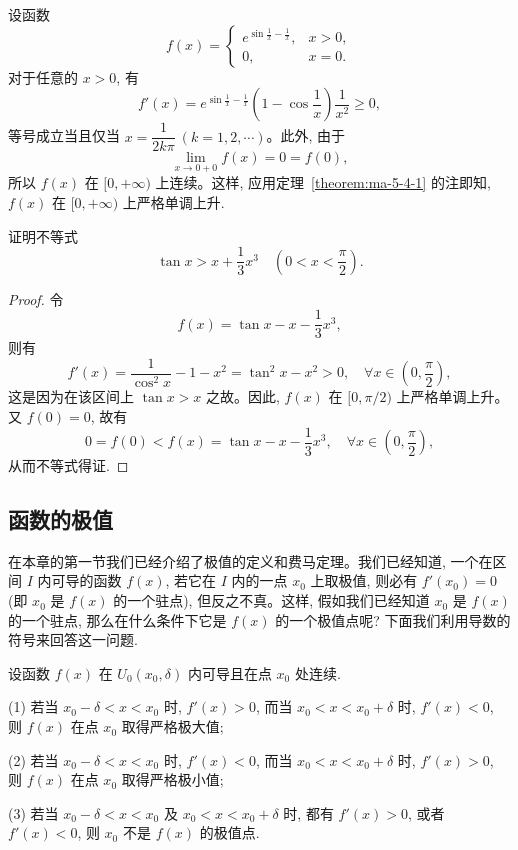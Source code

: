 \begin{example}\label{example:ma-5-4-1}
设函数
\[
  f(x)=
  \begin{cases}
    e^{\sin\frac1x-\frac1x}, & x>0,\\
    0, & x=0.
  \end{cases}
\]
对于任意的 $x>0$, 有
\[
  f'(x)=e^{\sin\frac1x-\frac1x}\left(1-\cos\frac1x\right)\frac1{x^2}\geqslant0,
\]
等号成立当且仅当 $x=\dfrac1{2k\pi}\ (k=1,2,\cdots)$。此外, 由于
\[
  \lim_{x\to0+0}f(x)=0=f(0),
\]
所以 $f(x)$ 在 $[0,+\infty)$ 上连续。这样, 应用定理~\ref{theorem:ma-5-4-1} 的注即知, $f(x)$ 在 $[0,+\infty)$ 上严格单调上升.
\end{example}


\begin{example}\label{example:ma-5-4-2}
证明不等式
\[
  \tan x>x+\frac13x^3\quad \left(0<x<\frac\pi2\right).
\]
\end{example}


\begin{proof}
令
\[
  f(x)=\tan x-x-\frac13x^3,
\]
则有
\[
  f'(x)=\frac1{\cos^2x}-1-x^2=\tan^2x-x^2>0,\quad \forall x\in\left(0,\frac\pi2\right),
\]
这是因为在该区间上 $\tan x>x$ 之故。因此, $f(x)$ 在 $[0,\pi/2)$ 上严格单调上升。又 $f(0)=0$, 故有
\[
  0=f(0)<f(x)=\tan x-x-\frac13x^3,\quad \forall x\in\left(0,\frac\pi2\right),
\]
从而不等式得证.
\end{proof}


\subsection{函数的极值}
\label{subsec:ma-5-4-2}

在本章的第一节我们已经介绍了极值的定义和费马定理。我们已经知道, 一个在区间 $I$ 内可导的函数 $f(x)$, 若它在 $I$ 内的一点 $x_0$ 上取极值, 则必有 $f'(x_0)=0$ (即 $x_0$ 是 $f(x)$ 的一个驻点), 但反之不真。这样, 假如我们已经知道 $x_0$ 是 $f(x)$ 的一个驻点, 那么在什么条件下它是 $f(x)$ 的一个极值点呢? 下面我们利用导数的符号来回答这一问题.

\begin{theorem}\label{theorem:ma-5-4-2}
设函数 $f(x)$ 在 $U_0(x_0,\delta)$ 内可导且在点 $x_0$ 处连续.

(1) 若当 $x_0-\delta<x<x_0$ 时, $f'(x)>0$, 而当 $x_0<x<x_0+\delta$ 时, $f'(x)<0$, 则 $f(x)$ 在点 $x_0$ 取得严格极大值;

(2) 若当 $x_0-\delta<x<x_0$ 时, $f'(x)<0$, 而当 $x_0<x<x_0+\delta$ 时, $f'(x)>0$, 则 $f(x)$ 在点 $x_0$ 取得严格极小值;

(3) 若当 $x_0-\delta<x<x_0$ 及 $x_0<x<x_0+\delta$ 时, 都有 $f'(x)>0$, 或者 $f'(x)<0$, 则 $x_0$ 不是 $f(x)$ 的极值点.
\end{theorem}

